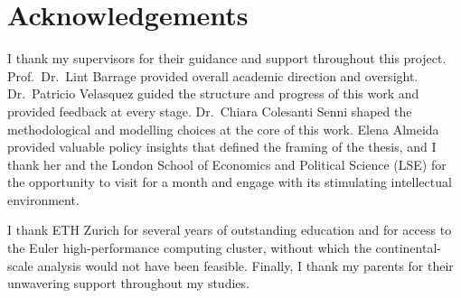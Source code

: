 \documentclass[12pt]{article}
\theoremstyle{break}
\begin{document}
\newpage
\section*{Acknowledgements}

I thank my supervisors for their guidance and support throughout this project.
Prof.\ Dr.\ Lint Barrage provided overall academic direction and oversight.
Dr.\ Patricio Velasquez guided the structure and progress of this work and provided
feedback at every stage. Dr.\ Chiara Colesanti Senni shaped the methodological and
modelling choices at the core of this work. Elena Almeida provided valuable policy 
insights that defined the framing of the thesis, and I thank her and the London
School of Economics and Political Science (LSE) for the opportunity to visit for a month and engage with its
stimulating intellectual environment.

I thank ETH Zurich for several years of outstanding education and for access to the
Euler high-performance computing cluster, without which the continental-scale
analysis would not have been feasible. Finally, I thank my parents for their
unwavering support throughout my studies.

\newpage


\end{document}
